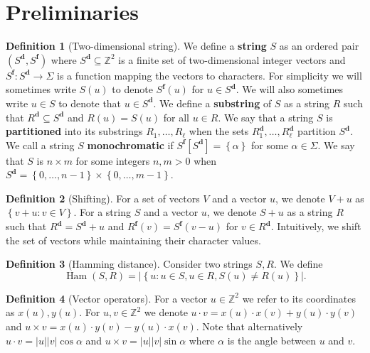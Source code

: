 \documentclass[11pt]{article}
\newcommand{\Z}{\mathbb{Z}}
\newcommand{\set}[1]{\left\lbrace #1 \right\rbrace}
\DeclareMathOperator*{\Ham}{Ham}
\theoremstyle{plain}
\theoremstyle{definition}
\newtheorem{definition}{Definition}
\begin{document}
\section{Preliminaries}

\renewcommand{\d}[1]{#1^\mathbf{d}}
\newcommand{\f}[1]{#1^\mathbf{f}}
\begin{definition}[Two-dimensional string]
	We define a \textbf{string} $S$ as an ordered pair $(\d{S}, \f{S})$ where $\d{S} \subseteq \Z^2$ is a finite set of two-dimensional integer vectors and $\f{S} : \d{S} \to \Sigma$
	is a function mapping the vectors to characters.
	For simplicity we will sometimes write $S(u)$ to denote $\f{S}(u)$ for $u \in \d{S}$.
	We will also sometimes write $u \in S$ to denote that $u \in \d{S}$.
	We define a \textbf{substring} of $S$ as a string $R$ such that $\d{R} \subseteq \d{S}$ and $R(u) = S(u)$ for all $u \in R$.
	We say that a string $S$ is \textbf{partitioned} into its substrings $R_1, \dots, R_\ell$ when the sets $\d{R_1}, \dots, \d{R_\ell}$ partition $\d{S}$.
	We call a string $S$ \textbf{monochromatic} if $\f{S}[\d{S}] = \set{\alpha}$ for some $\alpha \in \Sigma$.
	We say that $S$ is $n \times m$ for some integers $n, m > 0$ when $\d{S} = \set{0, \dots, n - 1} \times \set{0, \dots, m - 1}$.
\end{definition}


\begin{definition}[Shifting]
	For a set of vectors $V$ and a vector $u$, we denote $V + u$ as $\set{v + u : v \in V}$.
	For a string $S$ and a vector $u$, we denote $S + u$ as a string $R$ such that
	$\d{R} = \d{S} + u$ and $\f{R}(v) = \f{S}(v - u)$ for $v \in \d{R}$.
	Intuitively, we shift the set of vectors while maintaining their character values.
\end{definition}


\begin{definition}[Hamming distance]
	Consider two strings $S, R$. We define
	$$ \Ham(S, R) = |\set{u : u \in S, u \in R, S(u) \neq R(u)}|.$$
\end{definition}


\begin{definition}[Vector operators]
	For a vector $u \in \Z^2$ we refer to its coordinates as $x(u), y(u)$.
	For $u, v \in \Z^2$ we denote $u \cdot v = x(u) \cdot x(v) + y(u) \cdot y(v)$
	and $u \times v = x(u) \cdot y(v) - y(u) \cdot x(v)$.
	Note that alternatively $u \cdot v = |u||v| \cos \alpha$ and $u \times v = |u||v| \sin \alpha$ where $\alpha$ is the angle between $u$ and $v$.
\end{definition}
\end{document}
